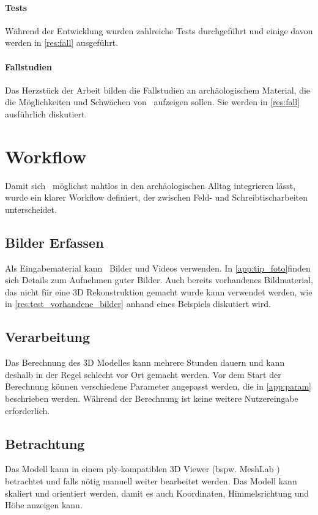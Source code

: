 		\paragraph{Tests}
		Während der Entwicklung wurden zahlreiche Tests durchgeführt und einige davon werden in \autoref{res:fall} ausgeführt.
		
		\paragraph{Fallstudien}
		Das Herzstück der Arbeit bilden die Fallstudien an archäologischem Material, die die Möglichkeiten und Schwächen von \dronarch\ aufzeigen sollen. Sie werden in \autoref{res:fall} ausführlich diskutiert.
		
	\section{Workflow}
		Damit sich \dronarch\ möglichst nahtlos in den archäologischen Alltag integrieren lässt, wurde ein klarer Workflow definiert, der zwischen Feld- und Schreibtischarbeiten unterscheidet.
		
		\subsection{Bilder Erfassen}
			Als Eingabematerial kann \dronarch\ Bilder und Videos verwenden. In \autoref{app:tip_foto}finden sich Details zum Aufnehmen guter Bilder.
			Auch bereits vorhandenes Bildmaterial, das nicht für eine 3D Rekonstruktion gemacht wurde kann  verwendet werden, wie in \autoref{res:test_vorhandene_bilder} anhand eines Beispiels diskutiert wird.
		
		\subsection{Verarbeitung}
			Das Berechnung des 3D Modelles kann mehrere Stunden dauern und kann deshalb in der Regel schlecht vor Ort gemacht werden. Vor dem Start der Berechnung können verschiedene Parameter angepasst werden, die in \autoref{app:param} beschrieben werden.
			Während der Berechnung ist keine weitere Nutzereingabe erforderlich.
		
		\subsection{Betrachtung}
			Das Modell kann in einem ply-kompatiblen 3D Viewer (bspw. MeshLab \cite{meshlab:home}) betrachtet und falls nötig manuell weiter bearbeitet werden.
			Das Modell kann skaliert und orientiert werden, damit es auch Koordinaten, Himmelsrichtung und Höhe anzeigen kann.

